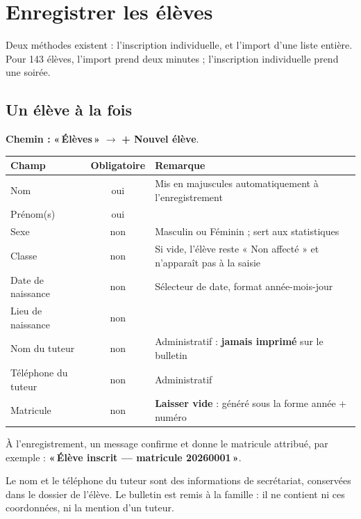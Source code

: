 \documentclass[11pt,a4paper]{article}
\newcommand{\menu}[1]{\textbf{«\,#1\,»}}
\newcommand{\bouton}[1]{\textbf{#1}}
\begin{document}
\newpage

\section{Enregistrer les élèves}

Deux méthodes existent : l'inscription individuelle, et l'import d'une liste
entière. Pour 143 élèves, l'import prend deux minutes ; l'inscription
individuelle prend une soirée.

\subsection{Un élève à la fois}

\textbf{Chemin :} \menu{Élèves} $\rightarrow$ \bouton{+ Nouvel élève}.

\begin{center}
\renewcommand{\arraystretch}{1.25}
\begin{tabularx}{\textwidth}{@{} >{\raggedright}p{4.3cm} c X@{}}
\toprule
\textbf{Champ} & \textbf{Obligatoire} & \textbf{Remarque} \\
\midrule
Nom & oui & Mis en majuscules automatiquement à l'enregistrement \\
Prénom(s) & oui & \\
Sexe & non & Masculin ou Féminin ; sert aux statistiques \\
Classe & non & Si vide, l'élève reste « Non affecté » et n'apparaît pas à la saisie \\
Date de naissance & non & Sélecteur de date, format année-mois-jour \\
Lieu de naissance & non & \\
Nom du tuteur & non & Administratif : \textbf{jamais imprimé} sur le bulletin \\
Téléphone du tuteur & non & Administratif \\
Matricule & non & \textbf{Laisser vide} : généré sous la forme année + numéro \\
\bottomrule
\end{tabularx}
\end{center}

À l'enregistrement, un message confirme et donne le matricule attribué, par
exemple : \menu{Élève inscrit — matricule 20260001}.

\begin{boiteattention}
Le nom et le téléphone du tuteur sont des informations de secrétariat,
conservées dans le dossier de l'élève. Le bulletin est remis à la famille : il ne
contient ni ces coordonnées, ni la mention d'un tuteur.
\end{boiteattention}
\end{document}
